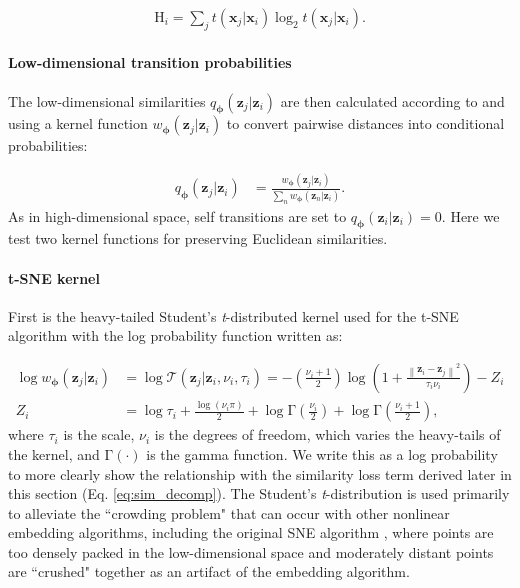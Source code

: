 \begin{align}
\mathrm{H}_i = \sum_{j} t(\mathbf{x}_j | \mathbf{x}_i) \log_2 t(\mathbf{x}_j | \mathbf{x}_i).
\end{align}
\paragraph{Low-dimensional transition probabilities} The low-dimensional similarities $q_{\boldsymbol{\phi}}(\mathbf{z}_j | \mathbf{z}_i)$ are then calculated according to \cite{hinton2003stochastic} and \cite{maaten2008tsne} using a kernel function $w_{\boldsymbol{\phi}}(\mathbf{z}_j | \mathbf{z}_i)$ to convert pairwise distances into conditional probabilities:

\begin{align}
    q_{\boldsymbol{\phi}}(\mathbf{z}_j | \mathbf{z}_i) &=  \frac{w_{\boldsymbol{\phi}}(\mathbf{z}_j | \mathbf{z}_i)}{\sum_{n} w_{\boldsymbol{\phi}}(\mathbf{z}_n | \mathbf{z}_i)}\label{eq:lowd_sim}.
\end{align}
As in high-dimensional space, self transitions are set to $q_{\boldsymbol{\phi}}(\mathbf{z}_i|\mathbf{z}_i) = 0$. Here we test two kernel functions for preserving Euclidean similarities. 
\paragraph{t-SNE kernel} First is the heavy-tailed Student's \textit{t}-distributed kernel used for the t-SNE algorithm \citep{maaten2008tsne} with the log probability function written as:

\begin{subequations}
    \begin{align}
    \log w_{\boldsymbol{\phi}}(\mathbf{z}_j | \mathbf{z}_i) &= \log \mathcal{T}(\mathbf{z
    }_j | \mathbf{z}_i, \nu_i, \tau_i) = -\left(\frac{\nu_i + 1}{2}\right)\log \left(1+\frac{\left\|\mathbf{z}_{i} - \mathbf{z}_{j} \right\|^{2}}{\tau_i \nu_i}\right) - Z_i \label{eq:tsne_logp}\\
    Z_i &= \log\tau_i + \frac{\log(\nu_i\pi)}{2} + \log \mathrm{\Gamma}\left(\frac{\nu_i}{2}\right) + \log \mathrm{\Gamma}\left(\frac{\nu_i + 1}{2}\right)\label{eq:tsne_z},
\end{align}
\end{subequations}
where $\tau_i$ is the scale, $\nu_i$ is the degrees of freedom, which varies the heavy-tails of the kernel, and $\mathrm{\Gamma}(\cdot)$ is the gamma function. We write this as a log probability to more clearly show the relationship with the similarity loss term derived later in this section (Eq. \ref{eq:sim_decomp}). The Student's \textit{t}-distribution is used primarily to alleviate the ``crowding problem" \citep{maaten2008tsne} that can occur with other nonlinear embedding algorithms, including the original SNE algorithm \citep{hinton2003stochastic}, where points are too densely packed in the low-dimensional space and moderately distant points are ``crushed" together as an artifact of the embedding algorithm. 

